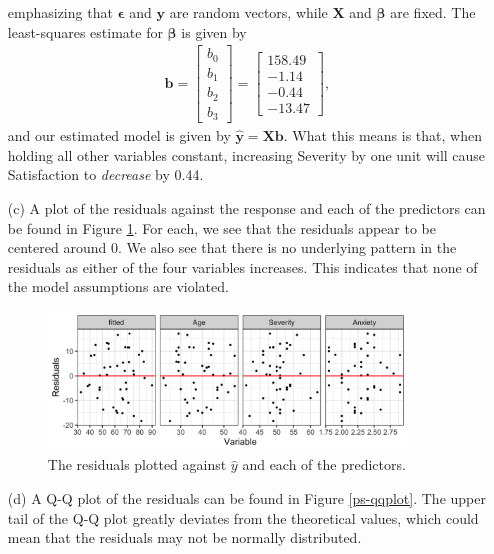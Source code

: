 \documentclass[10pt]{article}
\begin{document}
\begin{itemize}
    emphasizing that \(\bm{\epsilon}\) and \(\mathbf{y}\) are random vectors, while \(\mathbf{X}\) and \(\bm{\beta}\) are fixed. The least-squares estimate
    for \(\bm{\beta}\) is given by 
    \begin{align*}
        \mathbf{b} = \begin{bmatrix}
            b_0 \\ b_1 \\ b_2 \\ b_3
        \end{bmatrix}
        = \begin{bmatrix}
            158.49 \\ -1.14 \\ -0.44 \\ -13.47
        \end{bmatrix},
    \end{align*}
    and our estimated model is given by \(\hat{\mathbf{y}} = \mathbf{X} \mathbf{b}\). What this means is that, when holding all other variables constant, 
    increasing {Severity} by one unit will cause {Satisfaction} to \textsl{decrease} by 0.44.
    \item[(c)] A plot of the residuals against the response and each of the predictors can be found in Figure \ref{ps-residuals}. For each, we see that 
    the residuals appear to be centered around \(0\). We also see that there is no underlying pattern in the residuals as either of the four variables increases. 
    This indicates that none of the model assumptions are violated.
    \begin{figure}
        \centering
        \includegraphics[width = 0.9\textwidth]{img/ps-residuals.png}
        \caption{The residuals plotted against \(\hat{y}\) and each of the predictors.}
        \label{ps-residuals}
    \end{figure}
    \item[(d)] A Q-Q plot of the residuals can be found in Figure \ref{ps-qqplot}. The upper tail of the Q-Q plot greatly deviates from the theoretical values, which could mean that 
    the residuals may not be normally distributed. 

\end{itemize}
\end{document}
